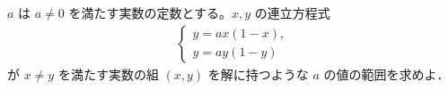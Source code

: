 \documentclass[8pt,dvipdfmx]{article}
\begin{document}
\begin{tcolorbox}[title=数学\textcircled{1} 3- 6 C]
\(a\) は \(a \neq 0\) を満たす実数の定数とする。\(x, y\) の連立方程式
\begin{align*}
\begin{cases}
y=ax(1-x) ,\\
y=ay(1-y)
\end{cases}
\end{align*}
が \(x \neq y\) を満たす実数の組 \((x, y)\) を解に持つような \(a\) の値の範囲を求めよ．
\end{tcolorbox}
\end{document}
